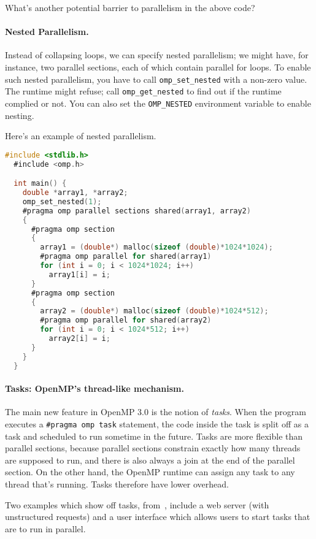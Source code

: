 {\sf What's another potential barrier to parallelism in the above code?}\\

\paragraph{Nested Parallelism.} Instead of collapsing loops, we can
specify nested parallelism; we might have, for instance, two parallel
sections, each of which contain parallel for loops. To enable
such nested parallelism, you have to call \verb+omp_set_nested+ with
a non-zero value. The runtime might refuse; call \verb+omp_get_nested+ to
find out if the runtime complied or not. You can also set the 
\verb+OMP_NESTED+ environment variable to enable nesting.

Here's an example of nested parallelism.
{\small
\begin{lstlisting}[language=C,morekeywords={foreach,pragma,omp,parallel,single,nowait,task,untied,barrier,taskyield}]
  #include <stdlib.h>
  #include <omp.h>

  int main() {
    double *array1, *array2;
    omp_set_nested(1);
    #pragma omp parallel sections shared(array1, array2)
    {
      #pragma omp section
      {
        array1 = (double*) malloc(sizeof (double)*1024*1024);
        #pragma omp parallel for shared(array1)
        for (int i = 0; i < 1024*1024; i++)
          array1[i] = i;
      }
      #pragma omp section
      {
        array2 = (double*) malloc(sizeof (double)*1024*512);
        #pragma omp parallel for shared(array2)
        for (int i = 0; i < 1024*512; i++)
          array2[i] = i;
      }
    }
  }
\end{lstlisting}
}

\paragraph{Tasks: OpenMP's thread-like mechanism.}
The main new feature in OpenMP 3.0 is the notion of \emph{tasks}. When
the program executes a \verb+#pragma omp task+ statement, the code
inside the task is split off as a task and scheduled to run sometime
in the future. Tasks are more flexible than parallel sections, because
parallel sections constrain exactly how many threads are supposed to
run, and there is also always a join at the end of the parallel
section.  On the other hand, the OpenMP runtime can assign any task to
any thread that's running. Tasks therefore have lower overhead.

Two examples which show off tasks,
from~\cite{Ayguade:2009:DOT:1512157.1512430}, include a web server (with
unstructured requests) and a user interface which allows users to
start tasks that are to run in parallel.

